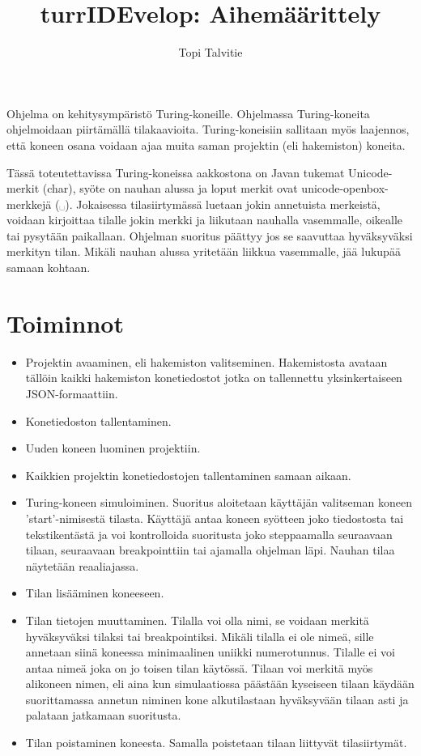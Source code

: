 \documentclass[a4paper, 11pt, finnish]{article}
\author{Topi Talvitie}
\title{turrIDEvelop: Aihemäärittely}
\begin{document}
\maketitle
Ohjelma on kehitysympäristö Turing-koneille. Ohjelmassa Turing-koneita
ohjelmoidaan piirtämällä tilakaavioita. Turing-koneisiin sallitaan myös
laajennos, että koneen osana voidaan ajaa muita saman projektin (eli
hakemiston) koneita.

Tässä toteutettavissa Turing-koneissa aakkostona on Javan tukemat
Unicode-merkit (char), syöte on nauhan alussa ja loput merkit ovat
unicode-openbox-merkkejä (␣). Jokaisessa tilasiirtymässä luetaan jokin
annetuista merkeistä, voidaan kirjoittaa tilalle jokin merkki ja liikutaan
nauhalla vasemmalle, oikealle tai pysytään paikallaan. Ohjelman suoritus
päättyy jos se saavuttaa hyväksyväksi merkityn tilan. Mikäli nauhan alussa
yritetään liikkua vasemmalle, jää lukupää samaan kohtaan.

\section*{Toiminnot}
\begin{itemize}
\item Projektin avaaminen, eli hakemiston valitseminen. Hakemistosta avataan
tällöin kaikki hakemiston konetiedostot jotka on tallennettu yksinkertaiseen
JSON-formaattiin.
\item Konetiedoston tallentaminen.
\item Uuden koneen luominen projektiin.
\item Kaikkien projektin konetiedostojen tallentaminen samaan aikaan.
\item Turing-koneen simuloiminen. Suoritus aloitetaan käyttäjän valitseman
koneen 'start'-nimisestä tilasta.
Käyttäjä antaa koneen syötteen joko tiedostosta tai tekstikentästä ja voi
kontrolloida suoritusta joko steppaamalla seuraavaan tilaan, seuraavaan
breakpointtiin tai ajamalla ohjelman läpi. Nauhan tilaa näytetään reaaliajassa.
\item Tilan lisääminen koneeseen.
\item Tilan tietojen muuttaminen. Tilalla voi olla nimi, se voidaan merkitä
hyväksyväksi tilaksi tai breakpointiksi. Mikäli tilalla ei ole nimeä, sille
annetaan siinä koneessa minimaalinen uniikki numerotunnus. Tilalle ei voi
antaa nimeä joka on jo toisen tilan käytössä. Tilaan voi merkitä myös
alikoneen nimen, eli aina kun simulaatiossa päästään kyseiseen tilaan käydään
suorittamassa annetun niminen kone alkutilastaan hyväksyvään tilaan asti ja
palataan jatkamaan suoritusta.
\item Tilan poistaminen koneesta. Samalla poistetaan tilaan liittyvät
tilasiirtymät.
\end{itemize}
\end{document}

